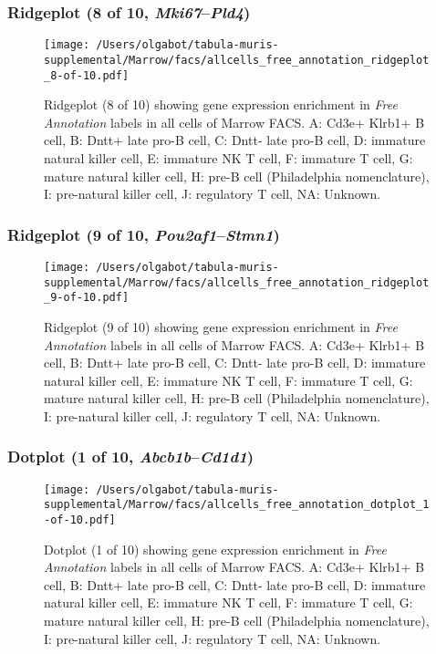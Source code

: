 \clearpage

\subsubsection{Ridgeplot (8 of 10, \emph{Mki67}--\emph{Pld4})}
\begin{figure}[h]
\centering
\texttt{[image: /Users/olgabot/tabula-muris-supplemental/Marrow/facs/allcells\_free\_annotation\_ridgeplot\_8-of-10.pdf]}

\caption{ Ridgeplot (8 of 10)  showing gene expression enrichment in \emph{Free Annotation} labels in all cells of Marrow FACS. A: Cd3e+ Klrb1+ B cell, B: Dntt+ late pro-B cell, C: Dntt- late pro-B cell, D: immature natural killer cell, E: immature NK T cell, F: immature T cell, G: mature natural killer cell, H: pre-B cell (Philadelphia nomenclature), I: pre-natural killer cell, J: regulatory T cell, NA: Unknown.}
\end{figure}


\clearpage

\subsubsection{Ridgeplot (9 of 10, \emph{Pou2af1}--\emph{Stmn1})}
\begin{figure}[h]
\centering
\texttt{[image: /Users/olgabot/tabula-muris-supplemental/Marrow/facs/allcells\_free\_annotation\_ridgeplot\_9-of-10.pdf]}

\caption{ Ridgeplot (9 of 10)  showing gene expression enrichment in \emph{Free Annotation} labels in all cells of Marrow FACS. A: Cd3e+ Klrb1+ B cell, B: Dntt+ late pro-B cell, C: Dntt- late pro-B cell, D: immature natural killer cell, E: immature NK T cell, F: immature T cell, G: mature natural killer cell, H: pre-B cell (Philadelphia nomenclature), I: pre-natural killer cell, J: regulatory T cell, NA: Unknown.}
\end{figure}


\clearpage

\subsubsection{Dotplot (1 of 10, \emph{Abcb1b}--\emph{Cd1d1})}
\begin{figure}[h]
\centering
\texttt{[image: /Users/olgabot/tabula-muris-supplemental/Marrow/facs/allcells\_free\_annotation\_dotplot\_1-of-10.pdf]}

\caption{ Dotplot (1 of 10)  showing gene expression enrichment in \emph{Free Annotation} labels in all cells of Marrow FACS. A: Cd3e+ Klrb1+ B cell, B: Dntt+ late pro-B cell, C: Dntt- late pro-B cell, D: immature natural killer cell, E: immature NK T cell, F: immature T cell, G: mature natural killer cell, H: pre-B cell (Philadelphia nomenclature), I: pre-natural killer cell, J: regulatory T cell, NA: Unknown.}
\end{figure}


